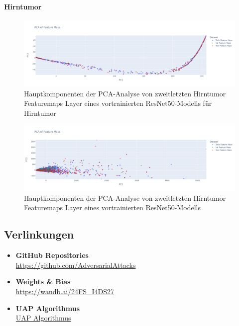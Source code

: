 \paragraph*{Hirntumor}

\begin{figure}[H]
    \centering
    \includegraphics[width=\linewidth]{01-images/06-ending/brain-all-feautremap-pca-ourmodel-resnet50.png}
    \caption{Hauptkomponenten der PCA-Analyse von zweitletzten Hirntumor Featuremaps Layer eines vortrainierten ResNet50-Modells für Hirntumor}
    \label{fig:brain-feautremap-pca-ourmodel-resnet50}
\end{figure}

\begin{figure}[H]
    \centering
    \includegraphics[width=\linewidth]{01-images/06-ending/brain-all-feautremap-pca-model-resnet50.png}
    \caption{Hauptkomponenten der PCA-Analyse von zweitletzten Hirntumor Featuremaps Layer eines vortrainierten ResNet50-Modells}
    \label{fig:brain-feautremap-pca-model-resnet50}
\end{figure}

\newpage

\subsection*{Verlinkungen}

\begin{itemize}

    \item \textbf{GitHub Repositories} \\
    \href{https://github.com/AdversarialAttacks}{https://github.com/AdversarialAttacks}
    
    \item \textbf{Weights \& Bias} \\
    \href{https://wandb.ai/24FS_I4DS27}
    {https://wandb.ai/24FS\_I4DS27}
    
    \item \textbf{UAP Algorithmus} \\
    \href{https://github.com/AdversarialAttacks/report/blob/main/01-images/05-UAP_ALG.png}{UAP Algorithmus}
    
\end{itemize}
